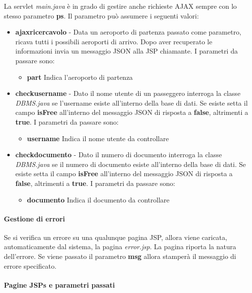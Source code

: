 \documentclass[a4paper,10pt]{article}
\begin{document}
 La servlet \textit{main.java} \`e in grado di gestire anche richieste AJAX sempre con lo stesso parametro \textbf{ps}. Il parametro pu\`o assumere i seguenti valori:
 \begin{itemize}
 \item \textbf{ajaxricercavolo} - Data un aeroporto di partenza passato come parametro, ricava tutti i possibili aeroporti di arrivo. Dopo aver recuperato le informazioni invia un messaggio JSON alla JSP
				  chiamante.
				  I parametri da passare sono:
				  \begin{itemize}
				   \item \textbf{part} Indica l'aeroporto di partenza
				  \end{itemize}

 \item \textbf{checkusername} - Dato il nome utente di un passeggero interroga la classe \textit{DBMS.java} se l'username esiste all'interno della base di dati. Se esiste setta il campo \textbf{isFree} all'interno 
				del messaggio JSON di risposta a \textbf{false}, altrimenti a \textbf{true}.
				  I parametri da passare sono:
				  \begin{itemize}
				   \item \textbf{username} Indica il nome utente da controllare
				  \end{itemize}
 \item \textbf{checkdocumento} - Dato il numero di documento interroga la classe \textit{DBMS.java} se il numero di documento esiste all'interno della base di dati.
				Se esiste setta il campo \textbf{isFree} all'interno 
				del messaggio JSON di risposta a \textbf{false}, altrimenti a \textbf{true}.
 				  I parametri da passare sono:
				  \begin{itemize}
				   \item \textbf{documento} Indica il documento da controllare
				  \end{itemize}
\end{itemize}

\paragraph{Gestione di errori}
Se si verifica un errore su una qualunque pagina JSP, allora viene caricata, automaticamente dal 
sistema, la pagina \textit{error.jsp}. La pagina riporta la natura dell'errore. Se viene passato il parametro \textbf{msg} allora 
stamper\`a il messaggio di errore specificato.

\paragraph{Pagine JSPs e parametri passati}
\end{document}
